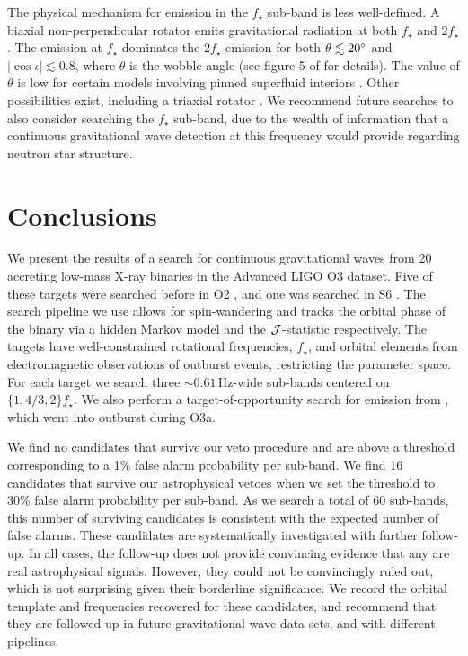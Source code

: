 The physical mechanism for emission in the $f_\star$ sub-band is less well-defined. A biaxial non-perpendicular rotator emits gravitational radiation at both $f_\star$ and $2f_\star$ \cite{JKS98, Jones2010, Jones2015}. The emission at $f_\star$ dominates the $2f_\star$ emission for both $\theta \lesssim 20^{\circ}$ and $|\cos\iota| \lesssim 0.8$, where $\theta$ is the wobble angle (see figure 5 of \citet{Sun2019} for details). The value of $\theta$ is low for certain models involving pinned superfluid interiors \cite{Jones2010, Melatos2015}. Other possibilities exist, including a triaxial rotator \cite{Zimmermann1980, Broeck2005, Lasky2013}. We recommend future searches to also consider searching the $f_\star$ sub-band, due to the wealth of information that a continuous gravitational wave detection at this frequency would provide regarding neutron star structure.

\section{Conclusions} \label{sec:amxp_concl}
We present the results of a search for continuous gravitational waves from 20 accreting low-mass X-ray binaries in the Advanced LIGO O3 dataset. Five of these targets were searched before in O2 \cite{Middleton2020}, and one was searched in S6 \cite{s6twoSpectScoXTE}. The search pipeline we use allows for spin-wandering and tracks the orbital phase of the binary via a hidden Markov model and the $\mathcal{J}$-statistic respectively. The targets have well-constrained rotational frequencies, $f_\star$, and orbital elements from electromagnetic observations of outburst events, restricting the parameter space. For each target we search three $\sim0.61\,$Hz-wide sub-bands centered on $\{1, 4/3, 2\}f_\star$. We also perform a target-of-opportunity search for emission from \sax, which went into outburst during O3a.

We find no candidates that survive our veto procedure and are above a threshold corresponding to a 1\% false alarm probability per sub-band. We find 16 candidates that survive our astrophysical vetoes when we set the threshold to 30\% false alarm probability per sub-band. As we search a total of 60 sub-bands, this number of surviving candidates is consistent with the expected number of false alarms. These candidates are systematically investigated with further follow-up. In all cases, the follow-up does not provide convincing evidence that any are real astrophysical signals. However, they could not be convincingly ruled out, which is not surprising given their borderline significance. We record the orbital template and frequencies recovered for these candidates, and recommend that they are followed up in future gravitational wave data sets, and with different pipelines. 

